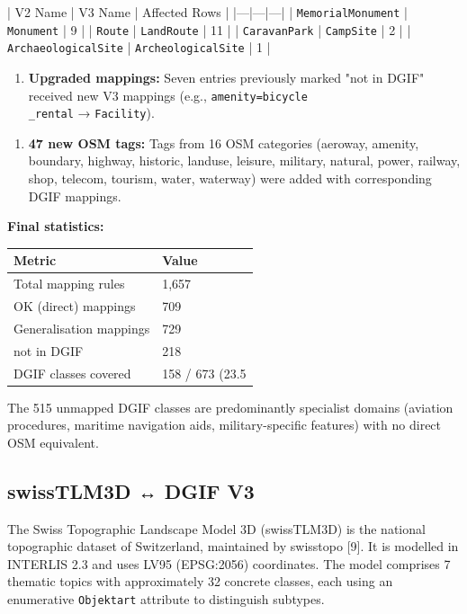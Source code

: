 \documentclass[conference]{IEEEtran}
\begin{document}
   | V2 Name | V3 Name | Affected Rows |
   |---|---|---|
   | \texttt{MemorialMonument} | \texttt{Monument} | 9 |
   | \texttt{Route} | \texttt{LandRoute} | 11 |
   | \texttt{CaravanPark} | \texttt{CampSite} | 2 |
   | \texttt{ArchaeologicalSite} | \texttt{ArcheologicalSite} | 1 |

\begin{enumerate}[leftmargin=*]
\item \textbf{Upgraded mappings:} Seven entries previously marked "not in DGIF" received new V3 mappings (e.g., \texttt{amenity=bicycle\\_rental} → \texttt{Facility}).
\end{enumerate}

\begin{enumerate}[leftmargin=*]
\item \textbf{47 new OSM tags:} Tags from 16 OSM categories (aeroway, amenity, boundary, highway, historic, landuse, leisure, military, natural, power, railway, shop, telecom, tourism, water, waterway) were added with corresponding DGIF mappings.
\end{enumerate}

\textbf{Final statistics:}

\begin{center}
\begin{longtable}{p{}p{}}
Metric & Value \\
\midrule
Total mapping rules & 1,657 \\
OK (direct) mappings & 709 \\
Generalisation mappings & 729 \\
not in DGIF & 218 \\
DGIF classes covered & 158 / 673 (23.5\\%
\end{longtable}
\end{center}


The 515 unmapped DGIF classes are predominantly specialist domains (aviation procedures, maritime navigation aids, military-specific features) with no direct OSM equivalent.

\subsection{swissTLM3D ↔ DGIF V3}

The Swiss Topographic Landscape Model 3D (swissTLM3D) is the national topographic dataset of Switzerland, maintained by swisstopo [9]. It is modelled in INTERLIS 2.3 and uses LV95 (EPSG:2056) coordinates. The model comprises 7 thematic topics with approximately 32 concrete classes, each using an enumerative \texttt{Objektart} attribute to distinguish subtypes.
\end{document}
